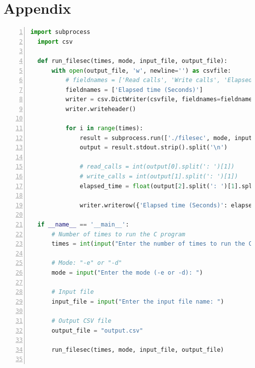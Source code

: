\documentclass{article}
\begin{document}
\section*{Appendix}
\begin{lstlisting}[language=Python, 
  basicstyle=\ttfamily\tiny, 
  numbers=left, 
  numberstyle=\tiny, 
  frame=single, 
  caption= {Pyhton code to call filesec an arbitrary amount of times and record the output in a csv file.},
  label=code:my_python_code]
  import subprocess
  import csv
  
  def run_filesec(times, mode, input_file, output_file):
      with open(output_file, 'w', newline='') as csvfile:
          # fieldnames = ['Read calls', 'Write calls', 'Elapsed time']
          fieldnames = ['Elapsed time (Seconds)']
          writer = csv.DictWriter(csvfile, fieldnames=fieldnames)
          writer.writeheader()
  
          for i in range(times):
              result = subprocess.run(['./filesec', mode, input_file], capture_output=True, text=True)
              output = result.stdout.strip().split('\n')
              
              # read_calls = int(output[0].split(': ')[1])
              # write_calls = int(output[1].split(': ')[1])
              elapsed_time = float(output[2].split(': ')[1].split(' ')[0])
  
              writer.writerow({'Elapsed time (Seconds)': elapsed_time})
  
  if __name__ == '__main__':
      # Number of times to run the C program
      times = int(input("Enter the number of times to run the C program: "))
  
      # Mode: "-e" or "-d"
      mode = input("Enter the mode (-e or -d): ")
  
      # Input file
      input_file = input("Enter the input file name: ")
  
      # Output CSV file
      output_file = "output.csv"
  
      run_filesec(times, mode, input_file, output_file)
  
\end{lstlisting}
\end{document}
